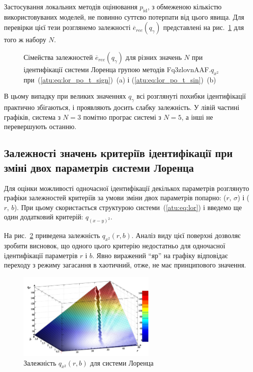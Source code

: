Застосування локальних методів оцінювання
$p_\mathrm{id} $, з обмеженою кількістю використовуваних моделей,
не повинно суттєво потерпати від цього явища. Для перевірки цієї тези
розглянемо залежності
$\overline{e}_{ree} (q_\gamma) $ представлені на рис.~\ref{atu:f:lor_N_ree} для того
ж набору $ N $.

\begin{figure}[htb!]
  \caption{Сімейства залежностей $ \overline{e}_{ree} (q_\gamma) $ для різних значень
    $ N $ при ідентифікації системи Лоренца групою методів Fq3zlovnAAF.$q_{x^2} $ при~(\ref{atu:eq:lor_po_t_sign})~(a) і (\ref{atu:eq:lor_po_t_sin})~(b)}
\label{atu:f:lor_N_ree}
\end{figure}

В цьому випадку при великих значеннях
$q_\gamma $ всі розглянуті похибки ідентифікації практично
збігаються, і проявляють досить слабку залежність. У лівій
частині графіків, система з
$N=3$ помітно програє системі з
$N=5$, а інші не перевершують останню.




\subsection{Залежності значень критеріїв ідентифікації при зміні двох параметрів системи Лоренца} %

Для оцінки можливості одночасної ідентифікації декількох параметрів
розглянуто графіки залежностей критеріїв за умови зміни двох параметрів
попарно: ($r$, $\sigma$) і ($r$, $b$).
%
При цьому скористається структурою системи~(\ref{atu:eq:lor}) і введемо
ще один додатковий критерій: $q_{(x-y)^2}$.

На рис.~\ref{atu:f:lor_qx2_r_b} приведена залежність
$q_{x^2} (r, b) $. Аналіз виду цієї поверхні дозволяє зробити
висновок, що одного цього критерію недостатньо для одночасної
ідентифікації параметрів
$r$ і
$b$. Явно виражений ``яр'' на графіку відповідає переходу з режиму
загасання в хаотичний, отже, не має принципового значення.

\begin{figure}[htb!]
  \begin{center}
    \includegraphics[width=0.60\textwidth]{p/cha/lor/q2d/lor_qx2_r_b.png}
  \end{center}
  \caption{Залежність $q_{x^2}(r,b)$ для системи Лоренца}
  \label{atu:f:lor_qx2_r_b}
\end{figure}


